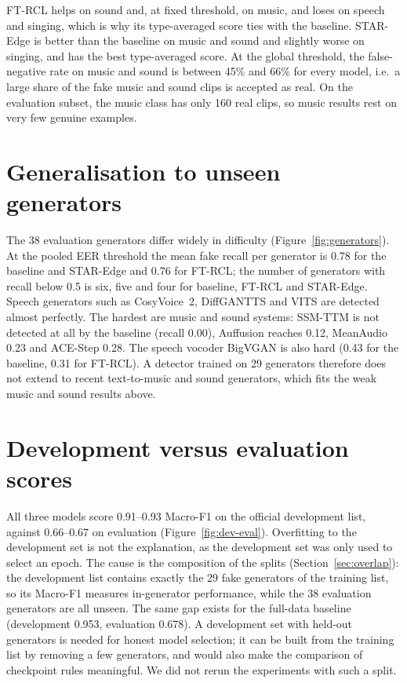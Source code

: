 
FT-RCL helps on sound and, at fixed threshold, on music, and loses on speech and singing, which is why its type-averaged score ties with the baseline. STAR-Edge is better than the baseline on music and sound and slightly worse on singing, and has the best type-averaged score. At the global threshold, the false-negative rate on music and sound is between 45\% and 66\% for every model, i.e.\ a large share of the fake music and sound clips is accepted as real. On the evaluation subset, the music class has only 160 real clips, so music results rest on very few genuine examples.

\section{Generalisation to unseen generators}
\label{sec:generators}

The 38 evaluation generators differ widely in difficulty (Figure~\ref{fig:generators}). At the pooled EER threshold the mean fake recall per generator is 0.78 for the baseline and STAR-Edge and 0.76 for FT-RCL; the number of generators with recall below 0.5 is six, five and four for baseline, FT-RCL and STAR-Edge. Speech generators such as CosyVoice~2, DiffGANTTS and VITS are detected almost perfectly. The hardest are music and sound systems: SSM-TTM is not detected at all by the baseline (recall 0.00), Auffusion reaches 0.12, MeanAudio 0.23 and ACE-Step 0.28. The speech vocoder BigVGAN is also hard (0.43 for the baseline, 0.31 for FT-RCL). A detector trained on 29 generators therefore does not extend to recent text-to-music and sound generators, which fits the weak music and sound results above.


\section{Development versus evaluation scores}
\label{sec:generator-gap}

All three models score 0.91--0.93 Macro-F1 on the official development list, against 0.66--0.67 on evaluation (Figure~\ref{fig:dev-eval}). Overfitting to the development set is not the explanation, as the development set was only used to select an epoch. The cause is the composition of the splits (Section~\ref{sec:overlap}): the development list contains exactly the 29 fake generators of the training list, so its Macro-F1 measures in-generator performance, while the 38 evaluation generators are all unseen. The same gap exists for the full-data baseline (development 0.953, evaluation 0.678). A development set with held-out generators is needed for honest model selection; it can be built from the training list by removing a few generators, and would also make the comparison of checkpoint rules meaningful. We did not rerun the experiments with such a split.

